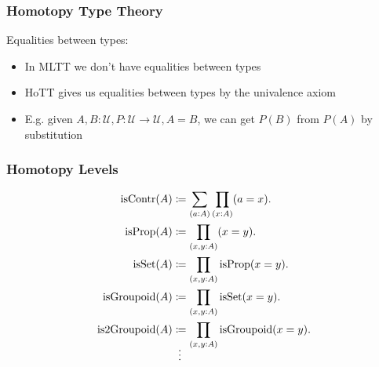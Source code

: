 \documentclass{beamer}
\begin{document}
\begin{frame}
\frametitle{Homotopy Type Theory}
Equalities between types:

\begin{itemize}

  \item In MLTT we don't have equalities between types
  \item HoTT gives us equalities between types by the univalence axiom 
  \item E.g. given $A, B : \mathcal{U}, P : \mathcal{U} \rightarrow \mathcal{U}, A = B$,
        we can get $P(B)$ from $P(A)$ by substitution

\end{itemize}


\end{frame}

\begin{frame}
\frametitle{Homotopy Levels}

\begin{align*}
  \text{isContr}(A) & \coloneqq \sum_{(a:A)} \prod_{(x:A)} (a = x).
  \\
  \text{isProp}(A) & \coloneqq \prod_{(x,y:A)} (x = y).
  \\
  \text{isSet}(A) & \coloneqq \prod_{(x,y:A)} \text{isProp}(x = y).
  \\
  \text{isGroupoid}(A) & \coloneqq \prod_{(x,y:A)} \text{isSet}(x = y).
  \\
  \text{is2Groupoid}(A) & \coloneqq \prod_{(x,y:A)} \text{isGroupoid}(x = y).
  \\
  \shortvdotswithin{=}
\end{align*}

\end{frame}
\end{document}
